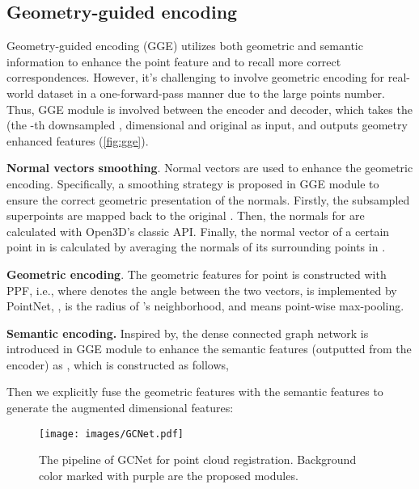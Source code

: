 \documentclass[10pt,twocolumn,letterpaper]{article}
\begin{document}
\subsection{Geometry-guided encoding}
\label{subsec:gge}
Geometry-guided encoding (GGE) utilizes both geometric and semantic information to enhance the point feature and to recall more correct correspondences. However, it’s challenging to involve geometric encoding for real-world dataset in a one-forward-pass manner due to the large points number. Thus, GGE module is involved between the encoder and decoder, which takes the  (the -th downsampled ,  dimensional  and original   as input, and outputs geometry enhanced features  (\cref{fig:gge}).

\textbf{Normal vectors smoothing}. 
Normal vectors are used to enhance the geometric encoding\cite{rusu2008aligning,rusu2009fast}. Specifically, a smoothing strategy is proposed in GGE module to ensure the correct geometric presentation of the normals. Firstly, the subsampled superpoints  are mapped back to the original . Then, the normals  for  are calculated with Open3D's classic API\cite{zhou2018open3d}. Finally, the normal vector of a certain point in   is calculated by averaging the normals of its surrounding points in . 

\textbf{Geometric encoding}. The geometric features  for point  is constructed with PPF\cite{drost2010model}, i.e., 
where  denotes the angle between the two vectors,  is implemented by PointNet\cite{qi2017pointnet}, ,  is the radius of 's neighborhood, 
and  means point-wise max-pooling.

\textbf{Semantic encoding.} Inspired by\cite{huang2021predator}, the dense connected graph network is introduced in GGE module to enhance the semantic features  (outputted from the encoder) as , which is constructed as follows,

Then we explicitly fuse the geometric features  with the semantic features  to generate the augmented  dimensional features: 


\begin{figure*}[!t]
\centering
\vspace{-.75em}
\texttt{[image: images/GCNet.pdf]}
\vspace{-1.25em}
\caption{The pipeline of GCNet for point cloud registration. Background color marked with purple are the proposed modules.}
\vspace{-1.5em}
\label{fig:gcnet}
\end{figure*}
\end{document}

